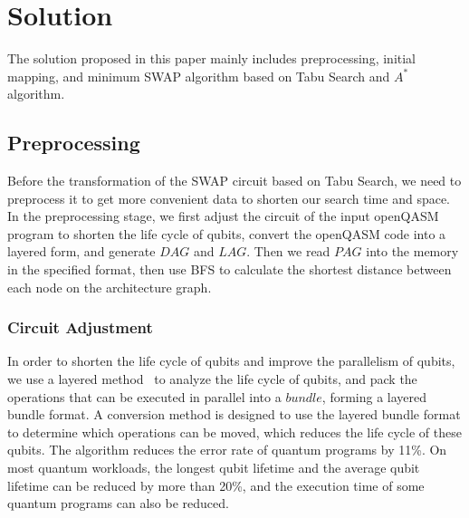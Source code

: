 \documentclass[runningheads]{llncs}
\begin{document}
\section{Solution}
\label{Solution}
The solution proposed in this paper mainly includes preprocessing, 
initial mapping, 
and minimum SWAP algorithm based on Tabu Search and  $A^{*}$ algorithm.
\subsection{Preprocessing}
Before the transformation of the SWAP circuit based on Tabu Search, 
we need to preprocess it to get more convenient data to shorten our search time and space.
In the preprocessing stage, we first adjust the circuit of the input openQASM 
program to shorten the life cycle of qubits, convert the openQASM code 
into a layered form, and generate $DAG$ and $LAG$.
Then we read $PAG$ into the memory in the specified format, then use BFS to calculate 
the shortest distance between each node on the architecture graph.
\subsubsection{Circuit Adjustment}
In order to shorten the life cycle of qubits and improve the parallelism of qubits, 
we use a layered method~\cite{2019Zhang} to analyze the life cycle of qubits, 
and pack the operations that can be executed in parallel into a $bundle$, forming a layered bundle format.
A conversion method is designed to use the layered bundle format to determine 
which operations can be moved, which reduces the life cycle of these qubits.
The algorithm reduces the error rate of quantum programs by 11\%. 
On most quantum workloads, the longest qubit lifetime and the average qubit lifetime 
can be reduced by more than 20\%, and the execution time of some quantum programs can also be reduced.
\end{document}
